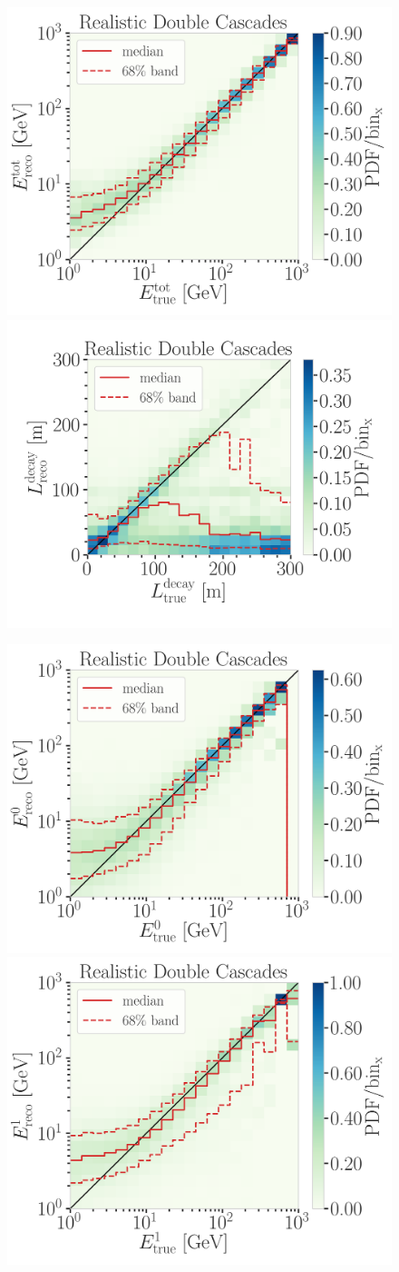 \begin{figure}
	\centering
    \includegraphics[width=0.49\linewidth]{figures/model_independent_simulation/results/realistic/2d_hists/194603_reco_total_energy_vs_true_total_energy_goodfit_step_contours.png}
    \includegraphics[width=0.49\linewidth]{figures/model_independent_simulation/results/realistic/2d_hists/194603_reco_decay_length_vs_true_decay_length_goodfit_step_contours.png}
    \caption[]{}
\end{figure}



\begin{figure}
	\centering
    \includegraphics[width=0.49\linewidth]{figures/model_independent_simulation/results/realistic/2d_hists/194603_casc0_reco_energy_vs_casc0_true_energy_goodfit_step_contours.png}
    \includegraphics[width=0.49\linewidth]{figures/model_independent_simulation/results/realistic/2d_hists/194603_casc1_reco_energy_vs_casc1_true_energy_goodfit_step_contours.png}
    \caption[]{}
\end{figure}


